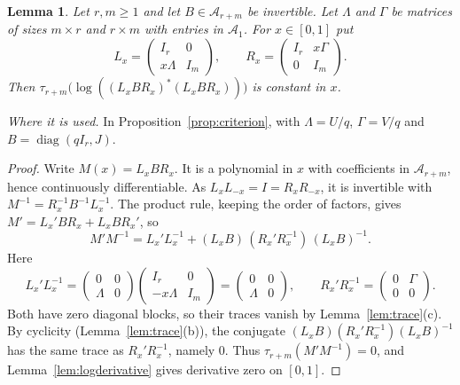 \documentclass[11pt]{article}
\newtheorem{lemma}[theorem]{Lemma}
\theoremstyle{remark}
\numberwithin{equation}{section}
\newcommand{\diag}{\operatorname{diag}}
\begin{document}
\begin{lemma}\label{lem:shears}
Let $r,m\ge1$ and let $B\in\mathcal A_{r+m}$ be invertible.
Let $\Lambda$ and $\Gamma$ be matrices of sizes $m\times r$ and $r\times m$ with entries in $\mathcal A_1$. For $x\in[0,1]$ put
\[
 L_x=\begin{pmatrix}I_r&0\\x\Lambda&I_m\end{pmatrix},\qquad
 R_x=\begin{pmatrix}I_r&x\Gamma\\0&I_m\end{pmatrix}.
\]
Then $\tau_{r+m}\bigl(\log((L_xBR_x)^*(L_xBR_x))\bigr)$ is constant in $x$.
\end{lemma}

\noindent\emph{Where it is used.} In Proposition~\ref{prop:criterion}, with $\Lambda=U/q$, $\Gamma=V/q$ and $B=\diag(qI_r,J)$.

\begin{proof}
Write $M(x)=L_xBR_x$. It is a polynomial in $x$ with coefficients in $\mathcal A_{r+m}$, hence continuously differentiable. As $L_xL_{-x}=I=R_xR_{-x}$, it is invertible with $M^{-1}=R_x^{-1}B^{-1}L_x^{-1}$. The product rule, keeping the order of factors, gives $M'=L_x'BR_x+L_xBR_x'$, so
\[
 M'M^{-1}=L_x'L_x^{-1}
 +(L_xB)\,(R_x'R_x^{-1})\,(L_xB)^{-1}.
\]
Here
\[
 L_x'L_x^{-1}=\begin{pmatrix}0&0\\\Lambda&0\end{pmatrix}\begin{pmatrix}I_r&0\\-x\Lambda&I_m\end{pmatrix}=\begin{pmatrix}0&0\\\Lambda&0\end{pmatrix},
 \qquad
 R_x'R_x^{-1}=\begin{pmatrix}0&\Gamma\\0&0\end{pmatrix}.
\]
Both have zero diagonal blocks, so their traces vanish by Lemma~\ref{lem:trace}(c). By cyclicity (Lemma~\ref{lem:trace}(b)), the conjugate $(L_xB)(R_x'R_x^{-1})(L_xB)^{-1}$ has the same trace as $R_x'R_x^{-1}$, namely $0$. Thus $\tau_{r+m}(M'M^{-1})=0$, and Lemma~\ref{lem:logderivative} gives derivative zero on $[0,1]$.
\end{proof}
\end{document}
